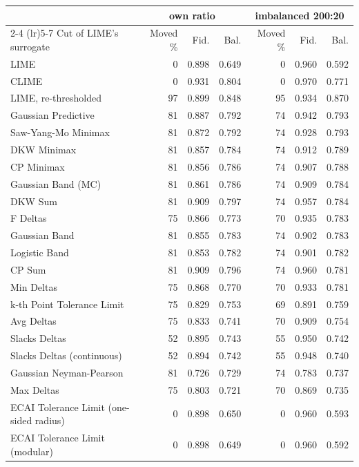 \begin{tabular}{@{}lrrrrrr@{}}
  \toprule
   & \multicolumn{3}{c}{own ratio} & \multicolumn{3}{c}{imbalanced 200:20} \\
  \cmidrule(lr){2-4} \cmidrule(lr){5-7}
  Cut of LIME's surrogate & Moved \% & Fid. & Bal. & Moved \% & Fid. & Bal. \\
  \midrule
  LIME & 0 & 0.898 & 0.649 & 0 & 0.960 & 0.592 \\
  CLIME & 0 & 0.931 & 0.804 & 0 & 0.970 & 0.771 \\
  LIME, re-thresholded & 97 & 0.899 & 0.848 & 95 & 0.934 & 0.870 \\
  \midrule
  Gaussian Predictive & 81 & 0.887 & 0.792 & 74 & 0.942 & 0.793 \\
  Saw-Yang-Mo Minimax & 81 & 0.872 & 0.792 & 74 & 0.928 & 0.793 \\
  DKW Minimax & 81 & 0.857 & 0.784 & 74 & 0.912 & 0.789 \\
  CP Minimax & 81 & 0.856 & 0.786 & 74 & 0.907 & 0.788 \\
  Gaussian Band (MC) & 81 & 0.861 & 0.786 & 74 & 0.909 & 0.784 \\
  DKW Sum & 81 & 0.909 & 0.797 & 74 & 0.957 & 0.784 \\
  F Deltas & 75 & 0.866 & 0.773 & 70 & 0.935 & 0.783 \\
  Gaussian Band & 81 & 0.855 & 0.783 & 74 & 0.902 & 0.783 \\
  Logistic Band & 81 & 0.853 & 0.782 & 74 & 0.901 & 0.782 \\
  CP Sum & 81 & 0.909 & 0.796 & 74 & 0.960 & 0.781 \\
  Min Deltas & 75 & 0.868 & 0.770 & 70 & 0.933 & 0.781 \\
  k-th Point Tolerance Limit & 75 & 0.829 & 0.753 & 69 & 0.891 & 0.759 \\
  Avg Deltas & 75 & 0.833 & 0.741 & 70 & 0.909 & 0.754 \\
  Slacks Deltas & 52 & 0.895 & 0.743 & 55 & 0.950 & 0.742 \\
  Slacks Deltas (continuous) & 52 & 0.894 & 0.742 & 55 & 0.948 & 0.740 \\
  Gaussian Neyman-Pearson & 81 & 0.726 & 0.729 & 74 & 0.783 & 0.737 \\
  Max Deltas & 75 & 0.803 & 0.721 & 70 & 0.869 & 0.735 \\
  ECAI Tolerance Limit (one-sided radius) & 0 & 0.898 & 0.650 & 0 & 0.960 & 0.593 \\
  ECAI Tolerance Limit (modular) & 0 & 0.898 & 0.649 & 0 & 0.960 & 0.592 \\
  \bottomrule
\end{tabular}
